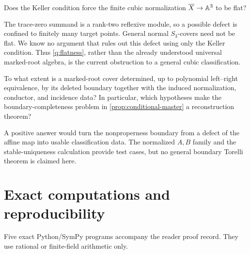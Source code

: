 \documentclass[11pt,reqno]{amsart}
\begin{document}
\begin{question}
\label{q:flatness}
Does the Keller condition force the finite cubic normalization
\(\overline X\to\mathbb A^3\) to be flat?
\end{question}

The trace-zero summand is a rank-two reflexive module, so a possible defect
is confined to finitely many target points.  General normal \(S_3\)-covers
need not be flat.  We know no argument that rules out this defect using only
the Keller condition.  Thus \cref{q:flatness}, rather than the already
understood universal marked-root algebra, is the current obstruction to a
general cubic classification.

\begin{question}
\label{q:boundary-torelli}
To what extent is a marked-root cover determined, up to polynomial
left--right equivalence, by its deleted boundary together with the induced
normalization, conductor, and incidence data?  In particular, which
hypotheses make the boundary-completeness problem in
\cref{prop:conditional-master} a reconstruction theorem?
\end{question}

A positive answer would turn the nonproperness boundary from a defect of the
affine map into usable classification data.  The normalized \(A,B\) family
and the stable-uniqueness calculation provide test cases, but no general
boundary Torelli theorem is claimed here.

\section{Exact computations and reproducibility}
\label{sec:computation}

Five exact Python/SymPy programs accompany the reader proof record.
They use rational or finite-field arithmetic only.
\end{document}
